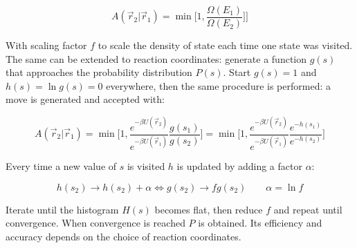 	$$A(\vec{r}_2|\vec{r}_1) = \min\biggl[1, \frac{\Omega(E_1)}{\Omega(E_2)}]\biggr]$$

	With scaling factor $f$ to scale the density of state each time one state was visited.
	The same can be extended to reaction coordinates: generate a function $g(s)$ that approaches the probability distribution $P(s)$.
	Start $g(s)=1$ and $h(s) = \ln g(s) = 0$ everywhere, then the same procedure is performed: a move is generated and accepted with:

	$$A(\vec{r}_2|\vec{r}_1) = \min\biggl[1, \frac{e^{-\beta U(\vec{r}_2)}}{e^{-\beta U(\vec{r}_1)}}\frac{g(s_1)}{g(s_2)}\biggr] = \min\biggl[1, \frac{e^{-\beta U(\vec{r}_2)}}{e^{-\beta U(\vec{r}_1)}}\frac{e^{-h(s_1)}}{e^{-h(s_2)}}\biggr]$$

	Every time a new value of $s$ is visited $h$ is updated by adding a factor $\alpha$:

	$$h(s_2) \rightarrow h(s_2) + \alpha \Leftrightarrow g(s_2)\rightarrow fg(s_2)\qquad \alpha = \ln f$$

	Iterate until the histogram $H(s)$ becomes flat, then reduce $f$ and repeat until convergence.
	When convergence is reached $P$ is obtained.
	Its efficiency and accuracy depends on the choice of reaction coordinates.
